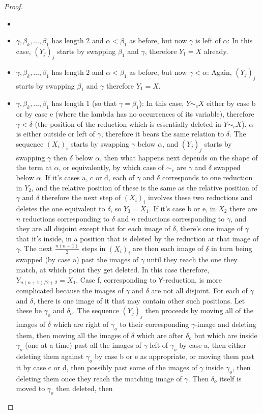 \documentclass{article}
\newcommand{\tY}{\mathsf{Y}}
\theoremstyle{definition}
\theoremstyle{lemma}
\theoremstyle{remark}
\begin{document}
\begin{proof}
\begin{itemize}
    \item {}
    \item $\gamma, \beta_k, \dots, \beta_1$ has length 2 and $\alpha < \beta_1$ as before, but now $\gamma$ is left of $\alpha$: In this case, $(Y_j)_j$ starts by swapping $\beta_1$ and $\gamma$, therefore $Y_1 = X$ already.
    \item $\gamma, \beta_k, \dots, \beta_1$ has length 2 and $\alpha < \beta_1$ as before, but now $\gamma < \alpha$: Again, $(Y_j)_j$ starts by swapping $\beta_1$ and $\gamma$ therefore $Y_1 = X$.
    \item $\gamma, \beta_k, \dots, \beta_1$ has length 1 (so that $\gamma = \beta_1$): In this case, $Y \sim_c X$ either by case b or by case e (where the lambda has no occurrences of its variable), therefore $\gamma < \delta$ (the position of the reduction which is essentially deleted in $Y \sim_c X$). $\alpha$ is either outside or left of $\gamma$, therefore it bears the same relation to $\delta$. The sequence $(X_i)_i$ starts by swapping $\gamma$ below $\alpha$, and $(Y_j)_j$ starts by swapping $\gamma$ then $\delta$ below $\alpha$, then what happens next depends on the shape of the term at $\alpha$, or equivalently, by which case of $\sim_c$ are $\gamma$ and $\delta$ swapped below $\alpha$. If it's cases a, c or d, each of $\gamma$ and $\delta$ corresponds to one reduction in $Y_2$, and the relative position of these is the same as the relative position of $\gamma$ and $\delta$ therefore the next step of $(X_i)_i$ involves these two reductions and deletes the one equivalent to $\delta$, so $Y_3 = X_1$. If it's case b or e, in $X_2$ there are $n$ reductions corresponding to $\delta$ and $n$ reductions corresponding to $\gamma$, and they are all disjoint except that for each image of $\delta$, there's one image of $\gamma$ that it's inside, in a position that is deleted by the reduction at that image of $\gamma$. The next $\frac{n(n+1)} 2$ steps in $(X_i)_i$ are then each image of $\delta$ in turn being swapped (by case a) past the images of $\gamma$ until they reach the one they match, at which point they get deleted. In this case therefore, $Y_{n(n+1)/2+2} = X_1$. Case f, corresponding to $\tY$-reduction, is more complicated because the images of $\gamma$ and $\delta$ are not all disjoint. For each of $\gamma$ and $\delta$, there is one image of it that may contain other such positions. Let these be $\gamma_o$ and $\delta_o$. The sequence $(Y_j)_j$ then proceeds by moving all of the images of $\delta$ which are right of $\gamma_o$ to their corresponding $\gamma$-image and deleting them, then moving all the images of $\delta$ which are after $\delta_o$ but which are inside $\gamma_o$ (one at a time) past all the images of $\gamma$ left of $\gamma_o$ by case a, then either deleting them against $\gamma_o$ by case b or e as appropriate, or moving them past it by case c or d, then possibly past some of the images of $\gamma$ inside $\gamma_o$, then deleting them once they reach the matching image of $\gamma$. Then $\delta_o$ itself is moved to $\gamma_o$ then deleted, then 
\end{itemize}
\end{proof}
\end{document}
